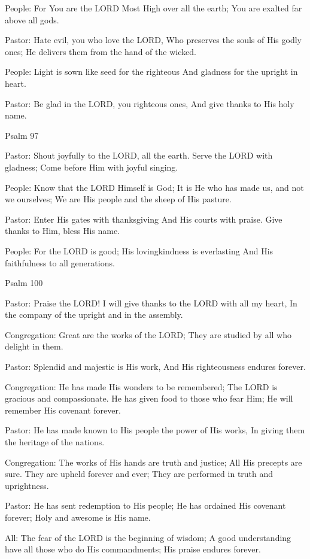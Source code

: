 \documentclass[]{book}
\begin{document}
People: For You are the LORD Most High over all the earth; You are
exalted far above all gods.

Pastor: Hate evil, you who love the LORD, Who preserves the souls of His
godly ones; He delivers them from the hand of the wicked.

People: Light is sown like seed for the righteous And gladness for the
upright in heart.

Pastor: Be glad in the LORD, you righteous ones, And give thanks to His
holy name.

Psalm 97 \textbar{}

Pastor: Shout joyfully to the LORD, all the earth. Serve the LORD with
gladness; Come before Him with joyful singing.

People: Know that the LORD Himself is God; It is He who has made us, and
not we ourselves; We are His people and the sheep of His pasture.

Pastor: Enter His gates with thanksgiving And His courts with praise.
Give thanks to Him, bless His name.

People: For the LORD is good; His lovingkindness is everlasting And His
faithfulness to all generations.

Psalm 100 \textbar{}

Pastor: Praise the LORD! I will give thanks to the LORD with all my
heart, In the company of the upright and in the assembly.

Congregation: Great are the works of the LORD; They are studied by all
who delight in them.

Pastor: Splendid and majestic is His work, And His righteousness endures
forever.

Congregation: He has made His wonders to be remembered; The LORD is
gracious and compassionate. He has given food to those who fear Him; He
will remember His covenant forever.

Pastor: He has made known to His people the power of His works, In
giving them the heritage of the nations.

Congregation: The works of His hands are truth and justice; All His
precepts are sure. They are upheld forever and ever; They are performed
in truth and uprightness.

Pastor: He has sent redemption to His people; He has ordained His
covenant forever; Holy and awesome is His name.

All: The fear of the LORD is the beginning of wisdom; A good
understanding have all those who do His commandments; His praise endures
forever.
\end{document}
